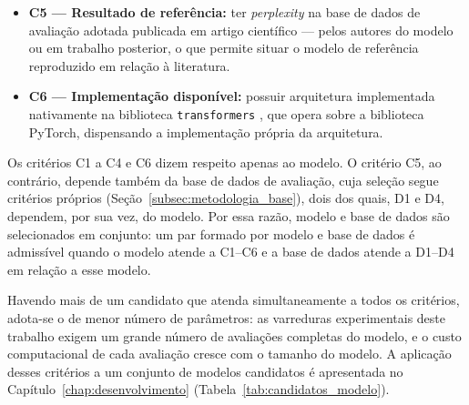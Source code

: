 \begin{itemize}
          medida ao longo deste trabalho seja atribuível exclusivamente à poda aqui
          aplicada.
    \item \textbf{C5 --- Resultado de referência:} ter \textit{perplexity} na base de dados
          de avaliação adotada publicada em artigo científico --- pelos autores do modelo ou
          em trabalho posterior, o que permite situar o modelo de referência
          reproduzido em relação à literatura.
    \item \textbf{C6 --- Implementação disponível:} possuir arquitetura implementada
          nativamente na biblioteca \texttt{transformers} \cite{Wolf2020}, que opera sobre
          a biblioteca PyTorch, dispensando a implementação própria da arquitetura.
\end{itemize}


Os critérios C1 a C4 e C6 dizem respeito apenas ao modelo. O critério C5, ao contrário,
depende também da base de dados de avaliação, cuja seleção segue critérios próprios
(Seção~\ref{subsec:metodologia_base}), dois dos quais, D1 e D4, dependem, por sua
vez, do modelo. Por essa razão, modelo e base de dados são selecionados em conjunto: um
par formado por modelo e base de dados é admissível quando o modelo atende a C1--C6 e a 
base de dados atende a D1--D4 em relação a esse modelo.

Havendo mais de um candidato que atenda simultaneamente a todos os critérios, adota-se o
de menor número de parâmetros: as varreduras experimentais deste trabalho exigem um grande
número de avaliações completas do modelo, e o custo computacional de cada avaliação cresce
com o tamanho do modelo. A aplicação desses critérios a um conjunto de modelos candidatos é
apresentada no Capítulo~\ref{chap:desenvolvimento} (Tabela~\ref{tab:candidatos_modelo}).



